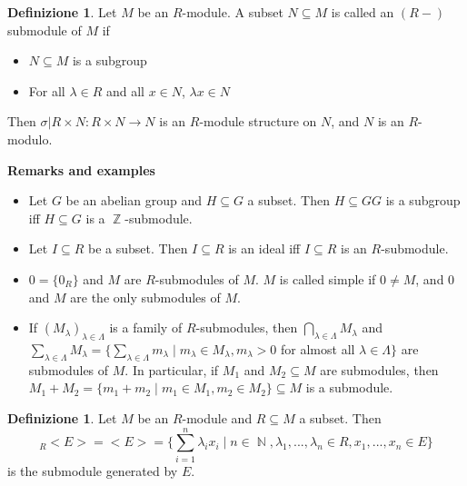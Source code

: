\documentclass[12pt,a4paper]{report}
\theoremstyle{definition}
\newtheorem{defn}[teo]{Definizione}  %
\theoremstyle{num.custom-title}
\DeclareMathOperator{\N}{\mathbb{N}}
\DeclareMathOperator{\Z}{\mathbb{Z}}
\DeclareMathOperator{\sse}{\subseteq}
\begin{document}
\begin{defn}
Let $M$ be an $R$-module. A subset $N \sse M$ is called an $(R-)$submodule of $M$ if 
\begin{itemize}
\item $N \sse M$ is a subgroup
\item For all $\lambda \in R$ and all $x \in N$, $\lambda x \in N$
\end{itemize}
Then $\sigma | R \times N : R \times N \to N$ is an $R$-module structure on $N$, and $N$ is an $R$-modulo.
\end{defn}

\textbf{Remarks and examples}
\begin{itemize}
\item Let $G$ be an abelian group and $H \sse G$ a subset. Then $H \sse GG$ is a subgroup iff $H \sse G$ is a $\Z$-submodule.
\item Let $I \sse R$ be a subset. Then $I \sse R$ is an ideal iff $I \sse R$ is an $R$-submodule.
\item $0=\{0_R\}$ and $M$ are $R$-submodules of $M$. $M$ is called simple if $0 \ne M$, and $0$ and $M$ are the only submodules of $M$.
\item If $(M_\lambda)_{\lambda \in \Lambda}$ is a family of $R$-submodules, then $\bigcap_{\lambda \in \Lambda} M_\lambda$ and $\sum_{\lambda \in \Lambda} M_\lambda = \{\sum_{\lambda \in \Lambda} m_\lambda \mid m_\lambda \in M_\lambda, m_\lambda > 0$ for almost all $\lambda \in \Lambda\}$ are submodules of $M$. In particular, if $M_1$ and $M_2 \sse M$ are submodules, then $M_1+M_2=\{m_1+m_2 \mid m_1 \in M_1, m_2 \in M_2\} \sse M$ is a submodule.
\end{itemize}

\begin{defn}
Let $M$ be an $R$-module and $R \sse M$ a subset. Then
\[
_R <E>=<E>=\{\sum_{i=1}^n \lambda_i x_i \mid n \in \N, \lambda_1,...,\lambda_n \in R, x_1,...,x_n \in E\}
\]
is the submodule generated by $E$.
\end{defn}
\end{document}
